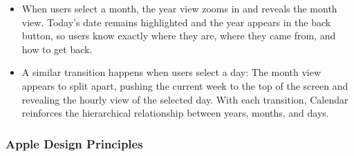 \begin{itemize}
\begin{itemize}
\begin{itemize}
		\item When users select a month, the year view zooms in and reveals the month view. Today's date remains highlighted and the year appears in the back button, so users know exactly where they are, where they came from, and how to get back.
		\item A similar transition happens when users select a day: The month view appears to split apart, pushing the current week to the top of the screen and revealing the hourly view of the selected day. With each transition, Calendar reinforces the hierarchical relationship between years, months, and days.
		\end{itemize}
	\end{itemize}
\end{itemize}

\subsubsection*{Apple Design Principles}
